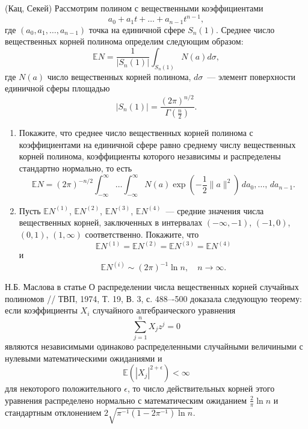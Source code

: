 \begin{problem}(Кац, Секей)
Рассмотрим полином с вещественными коэффициентами
\begin{equation*}
a_0+a_1t+\ldots+a_{n-1}t^{n-1},
\end{equation*}
где $(a_0,a_1,\dots,a_{n-1})$ точка на единичной сфере $S_n(1)$. 
 Среднее число вещественных корней полинома определим следующим образом:
$$
\mathbb{E} N = \frac{1}{|S_n(1)|}\int_{S_n(1)}N(a)d\sigma,
$$
где  $N(a)$ число вещественных корней полинома, $d\sigma$~--- элемент поверхности единичной сферы площадью
$$|S_n(1)| = \frac{(2\pi)^{n/2} }{ \Gamma\left(\frac{n}{2}\right) }.$$


\begin{enumerate}
\item 
Покажите, что среднее число вещественных корней полинома с коэффициентами на единичной сфере равно среднему числу вещественных корней полинома, коэффициенты которого независимы и распределены стандартно нормально, то есть 
\begin{equation*}
\mathbb{E} N = (2\pi)^{-n/2}\int_{-\infty}^{\infty}\dots\int_{-\infty}^{\infty}N(a)\exp \left(-\frac{1}{2}\|a\|^2\right)\,da_0,\dots,\,da_{n-1}.
\end{equation*}
\item 
Пусть $\mathbb{E}N^{(1)}$, $\mathbb{E}N^{(2)}$, $\mathbb{E}N^{(3)}$, $\mathbb{E}N^{(4)}$~--- средние значения числа вещественных корней, заключенных в интервалах $(-\infty,-1)$, $(-1,0)$, $(0,1)$, $(1,\infty)$ соответственно.
Покажите, что 
\begin{equation*}
\mathbb{E}N^{(1)}=\mathbb{E}N^{(2)}=\mathbb{E}N^{(3)}=\mathbb{E}N^{(4)} 
\end{equation*}
и
\begin{equation*}
\mathbb{E}N^{(i)}\sim (2\pi)^{-1}\ln n, \quad n\to\infty.
\end{equation*}
\end{enumerate}
\end{problem}
\begin{remark}
Н.Б. Маслова в статье О распределении числа вещественных корней случайных полиномов // ТВП, 1974, Т. 19, В. 3, с. 488–-500 доказала следующую теорему: если коэффициенты $X_i$ случайного алгебраического уравнения 
\[
\sum_{j=1}^n X_jz^j=0
\]
являются независимыми одинаково распределенными случайными величиными с нулевыми математическими ожиданиями и $$\mathbb{E}\left(|X_j|^{2+\epsilon}\right)<\infty$$ для некоторого положительного $\epsilon$, то число действительных корней этого уравнения распределено нормально с математическим ожиданием $\frac{2}{\pi}\ln n$ и стандартным отклонением $2\sqrt{\pi^{-1}(1-2\pi^{-1})\ln n}$.
\end{remark}


